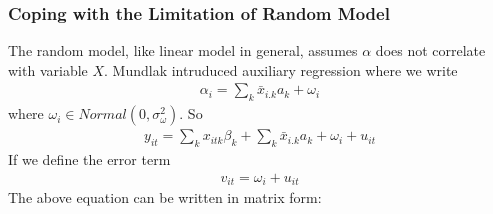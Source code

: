 \documentclass[a4paper]{article}
\begin{document}
\subsubsection{Coping with the Limitation of Random Model}
The random model, like linear model in general, assumes $\alpha$ does not correlate with variable $X$. Mundlak intruduced auxiliary regression where we write
\begin{align*}
\alpha_i = \sum_k \bar x_{i.k} a_k +\omega_i
\end{align*}
where $\omega_i \in Normal(0, \sigma^2_{\omega})$. So
\begin{align*}
y_{it} = \sum_k x_{itk}\beta_{k} + \sum_k \bar x_{i.k}a_k + \omega_i + u_{it}
\end{align*}
If we define the error term 
\begin{align*}
v_{it} = \omega_i + u_{it}
\end{align*}
The above equation can be written in matrix form:\\
\end{document}
